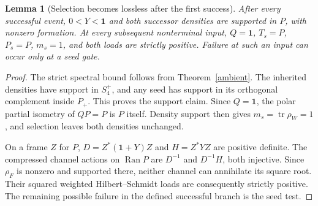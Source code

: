 \documentclass[11pt,letterpaper]{article}
\newcommand{\tr}{\operatorname{tr}}
\newcommand{\Ran}{\operatorname{Ran}}
\newcommand{\Id}{\mathbf 1}
\newtheorem{lemma}[theorem]{Lemma}
\theoremstyle{definition}
\numberwithin{equation}{section}
\begin{document}
\begin{lemma}[Selection becomes lossless after the first success]\label{losslessafter}
After every successful event, $0<Y<\Id$ and both successor densities are supported in $P$, with nonzero formation. At every subsequent nonterminal input, $Q=\Id$, $T_s=P$, $P_s=P$, $m_s=1$, and both loads are strictly positive. Failure at such an input can occur only at a seed gate.
\end{lemma}
\begin{proof}
The strict spectral bound follows from Theorem~\ref{ambient}. The inherited densities have support in $S_4^+$, and any seed has support in its orthogonal complement inside $P_+$. This proves the support claim. Since $Q=\Id$, the polar partial isometry of $QP=P$ is $P$ itself. Density support then gives $m_s=\tr\rho_W=1$, and selection leaves both densities unchanged.

On a frame $Z$ for $P$, $D=Z^*(\Id+Y)Z$ and $H=Z^*YZ$ are positive definite. The compressed channel actions on $\Ran P$ are $D^{-1}$ and $D^{-1}H$, both injective. Since $\rho_F$ is nonzero and supported there, neither channel can annihilate its square root. Their squared weighted Hilbert--Schmidt loads are consequently strictly positive. The remaining possible failure in the defined successful branch is the seed test.
\end{proof}
\end{document}
